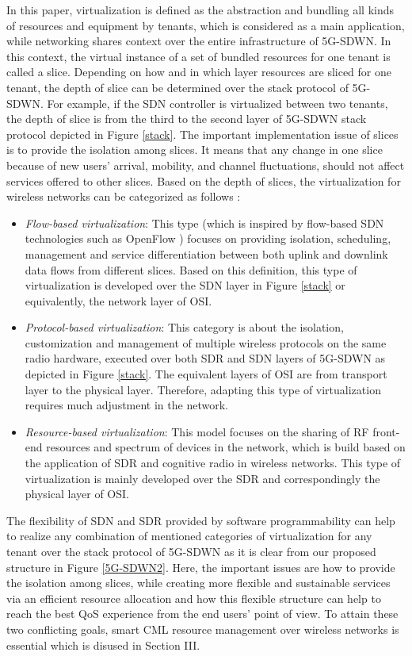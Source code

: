 \documentclass[conference]{IEEEtran}
\begin{document}
In this paper, virtualization is defined as the abstraction and bundling all kinds of resources and equipment by tenants, which is considered as a main application, while networking shares context over the entire infrastructure of 5G-SDWN. In this context, the virtual instance of a set of bundled resources for one tenant is called a slice. Depending on how and in which layer resources are sliced for one tenant, the depth of slice can be determined over the stack protocol of 5G-SDWN. For example, if the SDN controller is virtualized between two tenants, the depth of slice is from the third to the second layer of 5G-SDWN stack protocol depicted in Figure \ref{stack}. The important implementation issue of slices is to provide the isolation among slices. It means that any change in one slice because of new users' arrival, mobility, and channel fluctuations, should not affect services offered to other slices. Based on the depth of slices, the virtualization for wireless networks can be categorized as follows \cite{wen2013wireless}: 
\begin{itemize}
	\item \textit{Flow-based virtualization}: This type (which is inspired by flow-based SDN technologies such as OpenFlow \cite{mckeown2008openflow}) focuses on providing isolation, scheduling, management and service differentiation between both uplink and downlink data flows from different slices. Based on this definition, this type of virtualization is developed over the SDN layer in Figure \ref{stack} or equivalently, the network layer of OSI.
	\item \textit{Protocol-based virtualization}: This category is about the isolation, customization and management of multiple wireless protocols on the same radio hardware, executed over both SDR and SDN layers of 5G-SDWN as depicted in Figure \ref{stack}. The equivalent layers of OSI are from transport layer to the physical layer. Therefore, adapting this type of virtualization requires much adjustment in the network.  
	\item \textit{Resource-based virtualization}: This model focuses on the sharing of RF front-end resources and spectrum of devices in the network, which is build based on the application of SDR and cognitive radio in wireless networks. This type of virtualization is mainly developed over the SDR and correspondingly the physical layer of OSI. 
\end{itemize}
The flexibility of SDN and SDR provided by software programmability can help to realize any combination of mentioned categories of virtualization for any tenant over the stack protocol of 5G-SDWN as it is clear from our proposed structure in Figure \ref{5G-SDWN2}. Here, the important issues are how to provide the isolation among slices, while creating more flexible and sustainable services via an efficient resource allocation and how this flexible structure can help to reach the best QoS experience from the end users' point of view. To attain these two conflicting goals, smart CML resource management over wireless networks is essential which is disused in Section III.
\end{document}
